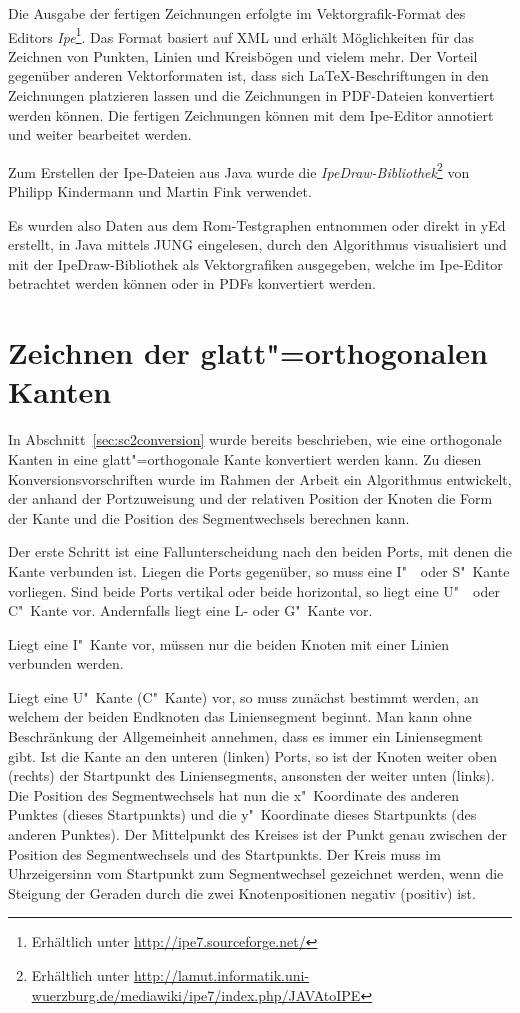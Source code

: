 \documentclass[a4paper]{scrreprt}
\theoremstyle{definition}
\begin{document}
Die Ausgabe der fertigen Zeichnungen erfolgte im Vektorgrafik-Format des Editors \emph{Ipe}\footnote{Erhältlich unter \url{http://ipe7.sourceforge.net/}}. Das Format basiert auf XML und erhält Möglichkeiten für das Zeichnen von Punkten, Linien und Kreisbögen und vielem mehr. Der Vorteil gegenüber anderen Vektorformaten ist, dass sich \LaTeX-Beschriftungen in den Zeichnungen platzieren lassen und die Zeichnungen in PDF-Dateien konvertiert werden können. Die fertigen Zeichnungen können mit dem Ipe-Editor annotiert und weiter bearbeitet werden.

Zum Erstellen der Ipe-Dateien aus Java wurde die \emph{IpeDraw-Bibliothek}\footnote{Erhältlich unter \url{http://lamut.informatik.uni-wuerzburg.de/mediawiki/ipe7/index.php/JAVAtoIPE}} von Philipp Kindermann und Martin Fink verwendet.

Es wurden also Daten aus dem Rom-Testgraphen entnommen oder direkt in yEd erstellt, in Java mittels JUNG eingelesen, durch den Algorithmus visualisiert und mit der IpeDraw-Bibliothek als Vektorgrafiken ausgegeben, welche im Ipe-Editor betrachtet werden können oder in PDFs konvertiert werden.

\section{Zeichnen der glatt"=orthogonalen Kanten}

In Abschnitt~\ref{sec:sc2conversion} wurde bereits beschrieben, wie eine orthogonale Kanten in eine glatt"=orthogonale Kante konvertiert werden kann. Zu diesen Konversionsvorschriften wurde im Rahmen der Arbeit ein Algorithmus entwickelt, der anhand der Portzuweisung und der relativen Position der Knoten die Form der Kante und die Position des Segmentwechsels berechnen kann. 

Der erste Schritt ist eine Fallunterscheidung nach den beiden Ports, mit denen die Kante verbunden ist. Liegen die Ports gegenüber, so muss eine I"~~oder S"~Kante vorliegen. Sind beide Ports vertikal oder beide horizontal, so liegt eine U"~~oder C"~Kante vor. Andernfalls liegt eine L- oder G"~Kante vor.

Liegt eine I"~Kante vor, müssen nur die beiden Knoten mit einer Linien verbunden werden. %

Liegt eine U"~Kante (C"~Kante) vor, so muss zunächst bestimmt werden, an welchem der beiden Endknoten das Liniensegment beginnt. Man kann ohne Beschränkung der Allgemeinheit annehmen, dass es immer ein Liniensegment gibt. Ist die Kante an den unteren (linken) Ports, so ist der Knoten weiter oben (rechts) der Startpunkt des Liniensegments, ansonsten der weiter unten (links). Die Position des Segmentwechsels hat nun die x"~Koordinate des anderen Punktes (dieses Startpunkts) und die y"~Koordinate dieses Startpunkts (des anderen Punktes). Der Mittelpunkt des Kreises ist der Punkt genau zwischen der Position des Segmentwechsels und des Startpunkts. Der Kreis muss im Uhrzeigersinn vom Startpunkt zum Segmentwechsel gezeichnet werden, wenn die Steigung der Geraden durch die zwei Knotenpositionen negativ (positiv) ist.
\end{document}
